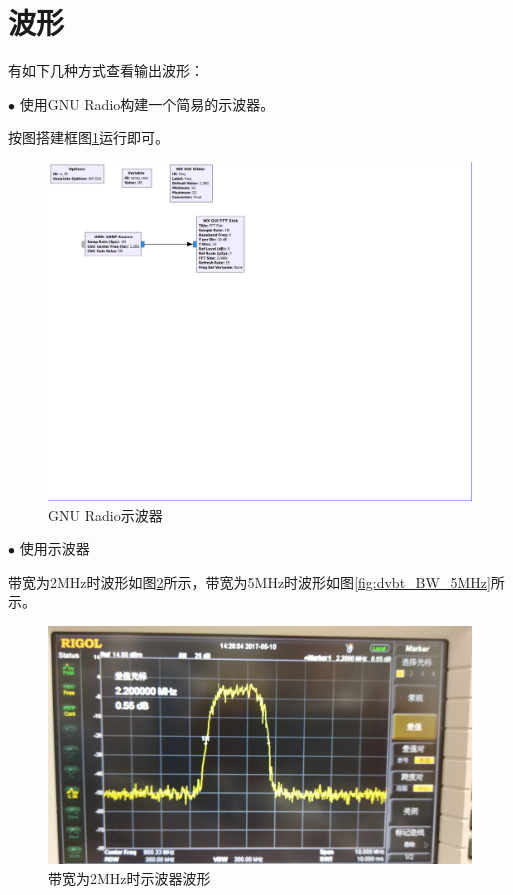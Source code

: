 	\section{波形}
		\par 有如下几种方式查看输出波形：
		\par $\bullet$ 使用GNU Radio构建一个简易的示波器。
		\par 按图搭建框图\ref{fig:dvbt_rx_fft}运行即可。
		\begin{figure}[htp]
			\centering
			\includegraphics[width=13cm]{figures/dvbt_rx_fft.png}
			\caption{GNU Radio示波器}
			\label{fig:dvbt_rx_fft}
		\end{figure}
		\par $\bullet$ 使用示波器
		\par 带宽为2MHz时波形如图\ref{fig:dvbt_BW_2MHz}所示，带宽为5MHz时波形如图\ref{fig:dvbt_BW_5MHz}所示。
		\begin{figure}[htp]
			\centering
			\includegraphics[width=13cm]{figures/dvbt_BW_2MHz.jpg}
			\caption{带宽为2MHz时示波器波形}
			\label{fig:dvbt_BW_2MHz}
		\end{figure}
